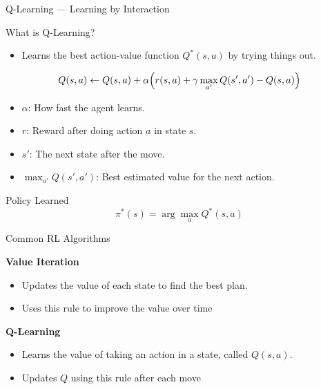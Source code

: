 \documentclass[aspectratio=169,xcolor=dvipsnames]{beamer}
\begin{document}
\begin{frame}{Q-Learning — Learning by Interaction}
    \begin{block}{What is Q-Learning?}
        \begin{itemize}
            \item Learns the best action-value function \( Q^*(s,a) \) by trying things out.
        \end{itemize}
    \end{block}
    
    \[
    Q(s,a) \leftarrow Q(s,a) + \alpha \Bigl( r(s,a) + \gamma \max_{a'} Q(s',a') - Q(s,a)\Bigr)
    \]

    \begin{itemize}
        \item \( \alpha \): How fast the agent learns.
        \item \( r \): Reward after doing action \( a \) in state \( s \).
        \item \( s' \): The next state after the move.
        \item \( \max_{a'} Q(s',a') \): Best estimated value for the next action.
    \end{itemize}
    
    \begin{block}{Policy Learned}
        \[
        \pi^*(s) = \arg\max_a Q^*(s,a)
        \]
    \end{block}

\end{frame}


\begin{frame}{Common RL Algorithms}

\textbf{Value Iteration}  
\begin{itemize}
    \item Updates the value of each state to find the best plan.  
    \item Uses this rule to improve the value over time 
  
\end{itemize}
\vspace{10pt}

\textbf{Q-Learning}  
\begin{itemize}
    \item Learns the value of taking an action in a state, called \( Q(s,a) \).  
    \item Updates \( Q \) using this rule after each move
    
\end{itemize}

\end{frame}
\end{document}
